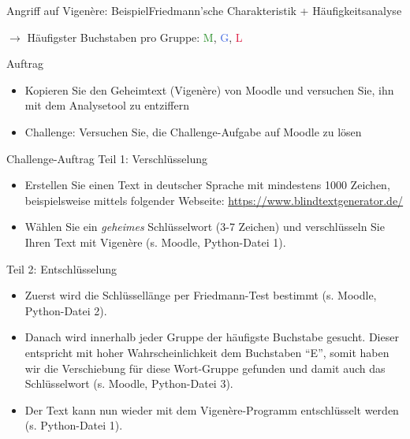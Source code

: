 \begin{frame}{Angriff auf Vigenère: Beispiel}{Friedmann'sche Charakteristik + Häufigkeitsanalyse}
\texttt{}
		
		$\rightarrow$ Häufigster Buchstaben pro Gruppe: \textcolor{ForestGreen}{M}, \textcolor{RoyalBlue}{G}, \textcolor{Crimson}{L}
		
		\begin{figure}[H]
			\centering
			\resizebox{.75\textwidth}{!}{\caesar[8] \caesar[2] \caesar[7]}
		\end{figure}
\end{frame}

\begin{frame}[label=auftrag]{Auftrag}
	\begin{itemize}
		\item Kopieren Sie den Geheimtext (Vigenère) von Moodle und versuchen Sie, ihn mit dem Analysetool zu entziffern
		\item {} Challenge: Versuchen Sie, die Challenge-Aufgabe auf Moodle zu lösen
	\end{itemize}
\end{frame}


\begin{frame}[label=auftrag]{ Challenge-Auftrag}
	\small
Teil 1: Verschlüsselung
\begin{itemize}
	\item Erstellen Sie einen Text in deutscher Sprache mit mindestens 1000 Zeichen, beispielsweise mittels folgender Webseite: \url{https://www.blindtextgenerator.de/}
	\item Wählen Sie ein \textit{geheimes} Schlüsselwort (3-7 Zeichen) und verschlüsseln Sie Ihren Text mit Vigenère (s. Moodle, Python-Datei 1).
\end{itemize}
Teil 2: Entschlüsselung
\begin{itemize}
	\item Zuerst wird die Schlüssellänge per Friedmann-Test bestimmt  (s. Moodle, Python-Datei 2). 
	\item Danach wird innerhalb jeder Gruppe der häufigste Buchstabe gesucht. Dieser entspricht mit hoher Wahrscheinlichkeit dem Buchstaben ``E'', somit haben wir die Verschiebung für diese Wort-Gruppe gefunden und damit auch das Schlüsselwort  (s. Moodle, Python-Datei 3).
	\item Der Text kann nun wieder mit dem Vigenère-Programm entschlüsselt werden  (s. Python-Datei 1). 
\end{itemize}
\normalsize
\end{frame}

